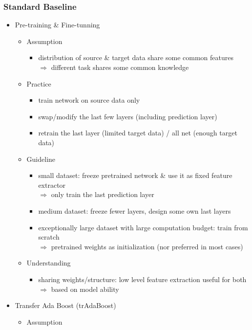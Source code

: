 \subsubsection{Standard Baseline}
\begin{itemize}
\item Pre-training \& Fine-tunning
	\begin{itemize}
	\item Assumption
		\begin{itemize}
		\item distribution of source \& target data share some common features \\
		$\Rightarrow$ different task shares some common knowledge
		\end{itemize}
	\item Practice
		\begin{itemize}
		\item train network on source data only
		\item swap/modify the last few layers (including prediction layer)
		\item retrain the last layer (limited target data) / all net (enough target data)
		\end{itemize}
	\item Guideline
		\begin{itemize}
		\item small dataset: freeze pretrained network \& use it as fixed feature extractor \\ 
		$\Rightarrow$ only train the last prediction layer
		\item medium dataset: freeze fewer layers, design some own last layers
		\item exceptionally large dataset with large computation budget: train from scratch \\
		$\Rightarrow$ pretrained weights as initialization (nor preferred in most cases)
		\end{itemize}
	\item Understanding
		\begin{itemize}
		\item sharing weights/structure: low level feature extraction useful for both \\
		$\Rightarrow$ based on model ability
		\end{itemize}
	\end{itemize}
\item Transfer Ada Boost (trAdaBoost)
	\begin{itemize}
	\item Assumption

\end{itemize}
\end{itemize}

